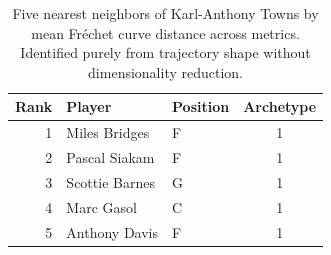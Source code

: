 \begin{table}[htbp]
  \centering\small
  \begin{tabular}{rllc}
    \toprule
    Rank & Player & Position & Archetype \\
    \midrule
    1 & Miles Bridges & F & 1 \\
    2 & Pascal Siakam & F & 1 \\
    3 & Scottie Barnes & G & 1 \\
    4 & Marc Gasol & C & 1 \\
    5 & Anthony Davis & F & 1 \\
    \bottomrule
  \end{tabular}
  \caption{Five nearest neighbors of Karl-Anthony Towns by mean Fr\'{e}chet curve distance across metrics. Identified purely from trajectory shape without dimensionality reduction.}
  \label{tab:Karl_Anthony_Towns_frechet_curve_neighbors}
\end{table}

